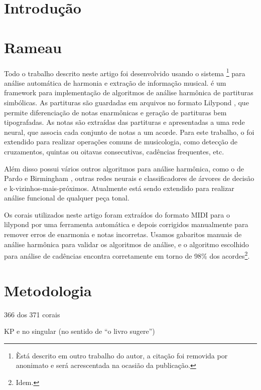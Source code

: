 \section{Introdução}
\label{sec:introducao}


\section{Rameau}
\label{sec:rameau}

Todo o trabalho descrito neste artigo foi desenvolvido usando o
sistema \rameau{}\footnote{Èstá descrito em outro trabalho do autor,
  a citação foi removida por anonimato e será acrescentada na ocasião
  da publicação.} para análise automática de harmonia e extração de
informação musical. \rameau{} é um framework para implementação de
algoritmos de análise harmônica de partituras simbólicas. As
partituras são guardadas em arquivos no formato Lilypond
\cite{nienhuys.ea08:lilypond}, que permite diferenciação de notas
enarmônicas e geração de partituras bem tipografadas. As notas são
extraídas das partituras e apresentadas a uma rede neural, que associa
cada conjunto de notas a um acorde. Para este trabalho, o \rameau{}
foi extendido para realizar operações comuns de musicologia, como
detecção de cruzamentos, quintas ou oitavas consecutivas, cadências
frequentes, etc.

Além disso \rameau{}  possui vários outros algoritmos para análise
harmônica, como o de Pardo e Birmingham \cite{pardo.ea00:automated},
outras redes neurais e classificadores de árvores de decisão e
k-vizinhos-mais-próximos. Atualmente \rameau{}  está sendo extendido para
realizar análise funcional de qualquer peça tonal.

Os corais utilizados neste artigo foram extraídos do formato MIDI para
o lilypond por uma ferramenta automática e depois corrigidos
manualmente para remover erros de enarmonia e notas incorretas. Usamos
gabaritos manuais de análise harmônica para validar os algoritmos de
análise, e o algoritmo escolhido para análise de cadências encontra
corretamente em torno de 98\% dos acordes\footnote{Idem.}.

\section{Metodologia}
\label{sec:metodologia}

366 dos 371 corais

KP e no singular (no sentido de ``o livro sugere'')

